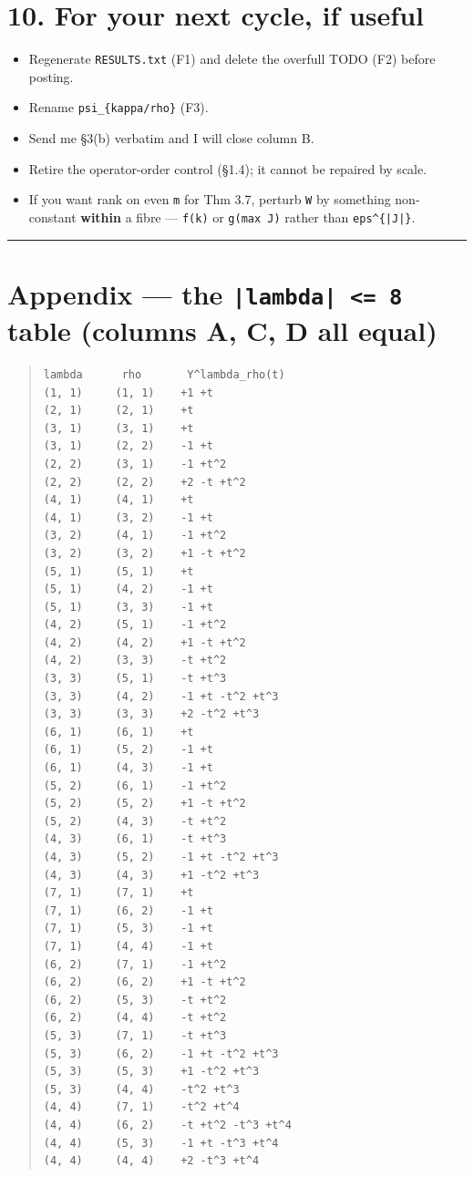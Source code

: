 \documentclass[11pt,a4paper]{article}
\begin{document}
\section*{10. For your next cycle, if useful}

\begin{itemize}
\item Regenerate \mbox{\texttt{RESULTS.txt}} (F1) and delete the overfull TODO (F2) before posting.
\item Rename \mbox{\texttt{psi\_\{kappa/rho\}}} (F3).
\item Send me \S{}3(b) verbatim and I will close column B.
\item Retire the operator-order control (\S{}1.4); it cannot be repaired by scale.
\item If you want rank on even \mbox{\texttt{m}} for Thm 3.7, perturb \mbox{\texttt{W}} by something non-constant \textbf{within} a fibre --- \mbox{\texttt{f(k)}} or \mbox{\texttt{g(max J)}} rather than \mbox{\texttt{eps\textasciicircum{}\{|J|\}}}.
\end{itemize}

\medskip\hrule\medskip

\section*{Appendix --- the \mbox{\texttt{|lambda| <= 8}} table (columns A, C, D all equal)}

\begin{quote}\footnotesize\begin{verbatim}
lambda      rho       Y^lambda_rho(t)
(1, 1)     (1, 1)    +1 +t
(2, 1)     (2, 1)    +t
(3, 1)     (3, 1)    +t
(3, 1)     (2, 2)    -1 +t
(2, 2)     (3, 1)    -1 +t^2
(2, 2)     (2, 2)    +2 -t +t^2
(4, 1)     (4, 1)    +t
(4, 1)     (3, 2)    -1 +t
(3, 2)     (4, 1)    -1 +t^2
(3, 2)     (3, 2)    +1 -t +t^2
(5, 1)     (5, 1)    +t
(5, 1)     (4, 2)    -1 +t
(5, 1)     (3, 3)    -1 +t
(4, 2)     (5, 1)    -1 +t^2
(4, 2)     (4, 2)    +1 -t +t^2
(4, 2)     (3, 3)    -t +t^2
(3, 3)     (5, 1)    -t +t^3
(3, 3)     (4, 2)    -1 +t -t^2 +t^3
(3, 3)     (3, 3)    +2 -t^2 +t^3
(6, 1)     (6, 1)    +t
(6, 1)     (5, 2)    -1 +t
(6, 1)     (4, 3)    -1 +t
(5, 2)     (6, 1)    -1 +t^2
(5, 2)     (5, 2)    +1 -t +t^2
(5, 2)     (4, 3)    -t +t^2
(4, 3)     (6, 1)    -t +t^3
(4, 3)     (5, 2)    -1 +t -t^2 +t^3
(4, 3)     (4, 3)    +1 -t^2 +t^3
(7, 1)     (7, 1)    +t
(7, 1)     (6, 2)    -1 +t
(7, 1)     (5, 3)    -1 +t
(7, 1)     (4, 4)    -1 +t
(6, 2)     (7, 1)    -1 +t^2
(6, 2)     (6, 2)    +1 -t +t^2
(6, 2)     (5, 3)    -t +t^2
(6, 2)     (4, 4)    -t +t^2
(5, 3)     (7, 1)    -t +t^3
(5, 3)     (6, 2)    -1 +t -t^2 +t^3
(5, 3)     (5, 3)    +1 -t^2 +t^3
(5, 3)     (4, 4)    -t^2 +t^3
(4, 4)     (7, 1)    -t^2 +t^4
(4, 4)     (6, 2)    -t +t^2 -t^3 +t^4
(4, 4)     (5, 3)    -1 +t -t^3 +t^4
(4, 4)     (4, 4)    +2 -t^3 +t^4
\end{verbatim}\end{quote}
\end{document}
